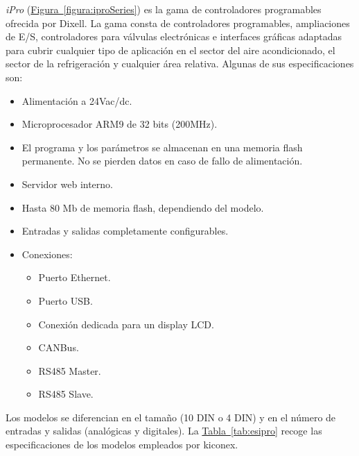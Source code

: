 \textit{iPro} (\hyperref[figura:iproSeries]{Figura~\ref{figura:iproSeries}}) es la gama de controladores programables ofrecida por Dixell. La gama consta de controladores programables, ampliaciones de E/S, controladores para válvulas electrónicas e interfaces gráficas adaptadas para cubrir cualquier tipo de aplicación en el sector del aire acondicionado, el sector de la refrigeración y cualquier área relativa. Algunas de sus especificaciones son:

\begin{itemize}
  \item Alimentación a 24Vac/dc.
  \item Microprocesador ARM9 de 32 bits (200MHz).
  \item El programa y los parámetros se almacenan en una memoria flash permanente. No se pierden datos en caso de fallo de alimentación.
  \item Servidor web interno.
  \item Hasta 80 Mb de memoria flash, dependiendo del modelo.
  \item Entradas y salidas completamente configurables.
  \item Conexiones:
  \begin{itemize}
    \item Puerto Ethernet.
    \item Puerto USB.
    \item Conexión dedicada para un display LCD.
    \item CANBus.
    \item RS485 Master.
    \item RS485 Slave.
  \end{itemize}
\end{itemize}

Los modelos se diferencian en el tamaño (10 DIN o 4 DIN) y en el número de entradas y salidas (analógicas y digitales). La \hyperref[tab:esipro]{Tabla~\ref{tab:esipro}} recoge las especificaciones de los modelos empleados por kiconex.

